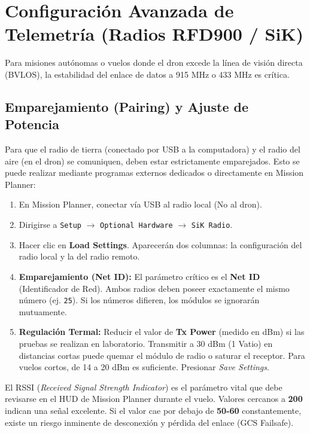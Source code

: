 \documentclass[12pt,a4paper]{article}
\begin{document}
\section{Configuración Avanzada de Telemetría (Radios RFD900 / SiK)}
Para misiones autónomas o vuelos donde el dron excede la línea de visión directa (BVLOS), la estabilidad del enlace de datos a 915 MHz o 433 MHz es crítica.

\subsection{Emparejamiento (Pairing) y Ajuste de Potencia}
Para que el radio de tierra (conectado por USB a la computadora) y el radio del aire (en el dron) se comuniquen, deben estar estrictamente emparejados. Esto se puede realizar mediante programas externos dedicados o directamente en Mission Planner:
\begin{enumerate}[leftmargin=*]
    \item En Mission Planner, conectar vía USB al radio local (No al dron).
    \item Dirigirse a \texttt{Setup} $\rightarrow$ \texttt{Optional Hardware} $\rightarrow$ \texttt{SiK Radio}.
    \item Hacer clic en \textbf{Load Settings}. Aparecerán dos columnas: la configuración del radio local y la del radio remoto.
    \item \textbf{Emparejamiento (Net ID):} El parámetro crítico es el \textbf{Net ID} (Identificador de Red). Ambos radios deben poseer exactamente el mismo número (ej. \texttt{25}). Si los números difieren, los módulos se ignorarán mutuamente.
    \item \textbf{Regulación Termal:} Reducir el valor de \textbf{Tx Power} (medido en dBm) si las pruebas se realizan en laboratorio. Transmitir a 30 dBm (1 Vatio) en distancias cortas puede quemar el módulo de radio o saturar el receptor. Para vuelos cortos, de 14 a 20 dBm es suficiente. Presionar \textit{Save Settings}.
\end{enumerate}

\begin{infobox}[title=Monitoreo del Enlace (RSSI)]
El RSSI (\textit{Received Signal Strength Indicator}) es el parámetro vital que debe revisarse en el HUD de Mission Planner durante el vuelo. Valores cercanos a \textbf{200} indican una señal excelente. Si el valor cae por debajo de \textbf{50-60} constantemente, existe un riesgo inminente de desconexión y pérdida del enlace (GCS Failsafe).
\end{infobox}
\end{document}
